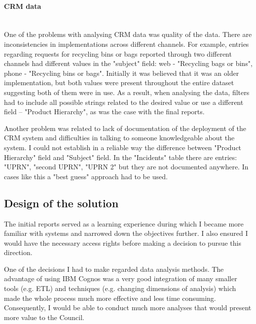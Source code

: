 				\paragraph{CRM data}\mbox{}\\
One of the problems with analysing CRM data was quality of the data. There are inconsistencies in implementations across different channels. For example, entries regarding requests for recycling bins or bags reported through two different channels had different values in the "subject" field: web - "Recycling bags or bins", phone - "Recycling bins or bags". Initially it was believed that it was an older implementation, but both values were present throughout the entire dataset suggesting both of them were in use. As a result, when analysing the data, filters had to include all possible strings related to the desired value or use a different field – "Product Hierarchy", as was the case with the final reports.

Another problem was related to lack of documentation of the deployment of the CRM system and difficulties in talking to someone knowledgeable about the system. I could not establish in a reliable way the difference between "Product Hierarchy" field and "Subject" field. In the "Incidents" table there are entries: "UPRN", "second UPRN", "UPRN 2" but they are not documented anywhere. In cases like this a "best guess" approach had to be used. 
				
		\subsection{Design of the solution}
		
The initial reports served as a learning experience during which I became more familiar with systems and narrowed down the objectives further. I also ensured I would have the necessary access rights before making a decision to pursue this direction.

One of the decisions I had to make regarded data analysis methods. The advantage of using IBM Cognos was a very good integration of many smaller tools (e.g. ETL) and techniques (e.g. changing dimensions of analysis) which made the whole process much more effective and less time consuming. Consequently, I would be able to conduct much more analyses that would present more value to the Council.

